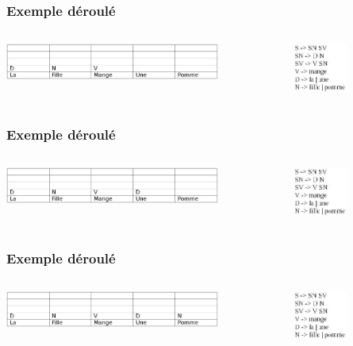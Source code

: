 \documentclass[table]{beamer}
\begin{document}
\begin{frame}
\frametitle{Exemple déroulé}
  \begin{columns}
  \begin{column}{0.6\textwidth}
     \includegraphics[width=200pt,]{4.jpeg}  
  \end{column}
  \begin{column}{0.5\textwidth}
  \includegraphics[width=50pt,]{11.jpeg}  
  \end{column}
  \end{columns}
\end{frame}

\begin{frame}
\frametitle{Exemple déroulé}
  \begin{columns}
  \begin{column}{0.6\textwidth}
     \includegraphics[width=200pt,]{5.jpeg}  
  \end{column}
  \begin{column}{0.5\textwidth}
  \includegraphics[width=50pt,]{11.jpeg}  
  \end{column}
  \end{columns}
\end{frame}

\begin{frame}
\frametitle{Exemple déroulé}
  \begin{columns}
  \begin{column}{0.6\textwidth}
     \includegraphics[width=200pt,]{6.jpeg}  
  \end{column}
  \begin{column}{0.5\textwidth}
  \includegraphics[width=50pt,]{11.jpeg}  
  \end{column}
  \end{columns}
\end{frame}
\end{document}
